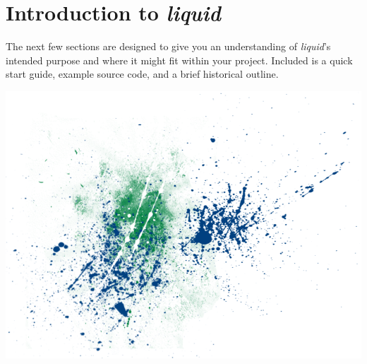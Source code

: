 \documentclass[11pt,twoside]{article}
\newcommand{\liquid}{{\it liquid}}
\begin{document}


\pagestyle{headings}

%
%

\newpage
\part{Introduction to \liquid }
\label{part:intro}

\bigskip
\noindent
The next few sections are designed to give you an understanding of
\liquid's intended purpose and where it might fit within your project.
Included is a quick start guide, example source code, and a brief
historical outline.

\vfill

\includegraphics[width=\textwidth]{graphics/liquid_splatter_01.png}

\vfill





%
%
\newpage
\end{document}

